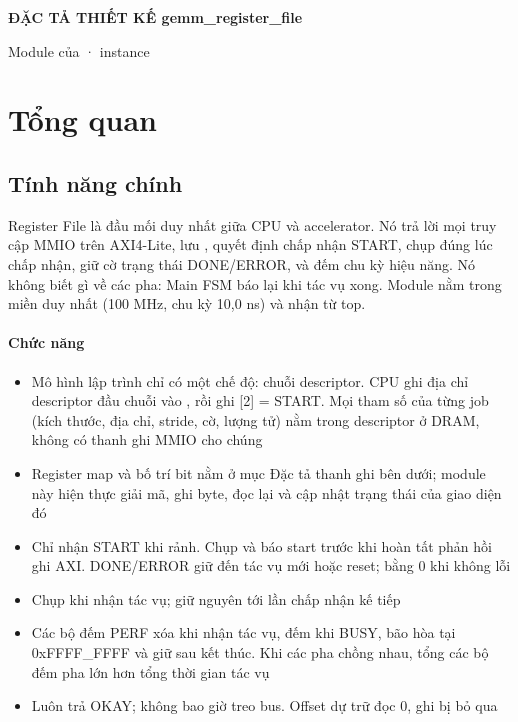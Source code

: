 \documentclass[10pt,a4paper]{article}
\begin{document}
{\Large\bfseries ĐẶC TẢ THIẾT KẾ gemm\_register\_file}\par
\vspace{2pt}
{\small\color{muted}Module của  · instance }\par
\tableofcontents
\clearpage

\section{Tổng quan}
\subsection{Tính năng chính}\label{sec:1}

Register File là đầu mối duy nhất giữa CPU và accelerator. Nó trả lời mọi truy cập MMIO trên AXI4-Lite, lưu , quyết định chấp nhận START, chụp  đúng lúc chấp nhận, giữ cờ trạng thái DONE/ERROR, và đếm chu kỳ hiệu năng. Nó không biết gì về các pha: Main FSM báo lại khi tác vụ xong. Module nằm trong miền  duy nhất (100 MHz, chu kỳ 10,0 ns) và nhận  từ top.

\paragraph{Chức năng}\label{par:1-1}
\begin{itemize}
\item Mô hình lập trình chỉ có một chế độ: chuỗi descriptor. CPU ghi địa chỉ descriptor đầu chuỗi vào , rồi ghi [2] = START. Mọi tham số của từng job (kích thước, địa chỉ, stride, cờ, lượng tử) nằm trong descriptor ở DRAM, không có thanh ghi MMIO cho chúng
\item Register map và bố trí bit nằm ở mục Đặc tả thanh ghi bên dưới; module này hiện thực giải mã, ghi byte, đọc lại và cập nhật trạng thái của giao diện đó
\item Chỉ nhận START khi rảnh. Chụp  và báo start trước khi hoàn tất phản hồi ghi AXI. DONE/ERROR giữ đến tác vụ mới hoặc reset;  bằng 0 khi không lỗi
\item Chụp  khi nhận tác vụ; giữ nguyên tới lần chấp nhận kế tiếp
\item Các bộ đếm PERF xóa khi nhận tác vụ, đếm khi BUSY, bão hòa tại 0xFFFF\_FFFF và giữ sau kết thúc. Khi các pha chồng nhau, tổng các bộ đếm pha lớn hơn tổng thời gian tác vụ
\item Luôn trả OKAY; không bao giờ treo bus. Offset dự trữ đọc 0, ghi bị bỏ qua
\end{itemize}
\end{document}
